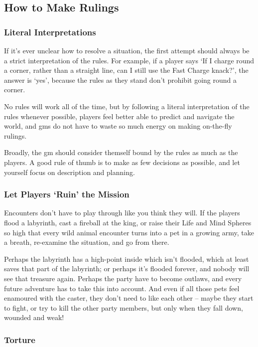 \begin{multicols}{2}
\subsection{How to Make Rulings}

\subsubsection{Literal Interpretations}

If it's ever unclear how to resolve a situation, the first attempt should always be a strict interpretation of the rules.
For example, if a player says `If I charge round a corner, rather than a straight line, can I still use the Fast Charge knack?', the answer is `yes', because the rules as they stand don't prohibit going round a corner.

No rules will work all of the time, but by following a literal interpretation of the rules whenever possible, players feel better able to predict and navigate the world, and \glspl{gm} do not have to waste so much energy on making on-the-fly rulings.

Broadly, the \gls{gm} should consider themself bound by the rules as much as the players.
A good rule of thumb is to make as few decisions as possible, and let yourself focus on description and planning.

\subsubsection{Let Players `Ruin' the Mission}

Encounters don't have to play through like you think they will.
If the players flood a labyrinth, cast a fireball at the king, or raise their Life and Mind Spheres so high that every wild animal encounter turns into a pet in a growing army, take a breath, re-examine the situation, and go from there.

Perhaps the labyrinth has a high-point inside which isn't flooded, which at least saves that part of the labyrinth; or perhaps it's flooded forever, and nobody will see that treasure again.
Perhaps the party have to become outlaws, and every future adventure has to take this into account.
And even if all those pets feel enamoured with the caster, they don't need to like each other -- maybe they start to fight, or try to kill the other party members, but only when they fall down, wounded and weak!

\subsubsection{Torture}


\end{multicols}

